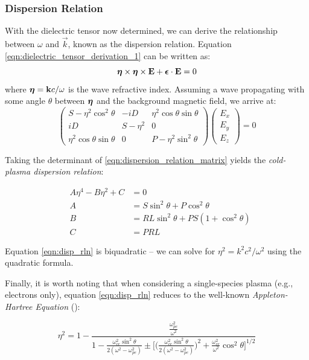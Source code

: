 \subsubsection{Dispersion Relation}
With the dielectric tensor now determined, we can derive the relationship between $\omega$ and $\vec{k}$, known as the dispersion relation. Equation \ref{eqn:dielectric_tensor_derivation_1} can be written as:
\begin{equation}
\boldsymbol{\eta}\times \boldsymbol{\eta} \times \mathbf{E} +  \boldsymbol{\epsilon}\cdot\mathbf{E} = 0
\end{equation}
where $\boldsymbol{\eta} = \mathbf{k}c/\omega$ is the wave refractive index. Assuming a wave propagating with some angle $\theta$ between $\boldsymbol{\eta}$ and the background magnetic field, we arrive at:
\begin{equation}
\begin{pmatrix}
S - \eta^2\cos^2\theta & -iD & \eta^2\cos{\theta}\sin{\theta} \\
iD & S - \eta^2 & 0 \\
\eta^2\cos{\theta}\sin{\theta} & 0 & P - \eta^2\sin^2{\theta} \end{pmatrix}\begin{pmatrix}E_x \\ E_y \\ E_z\end{pmatrix} = 0
\label{eqn:dispersion_relation_matrix}
\end{equation}

Taking the determinant of \ref{eqn:dispersion_relation_matrix} yields the \emph{cold-plasma dispersion relation}:

\begin{eqnarray}
&A\eta^4 - B\eta^2 + C &= 0 \label{eqn:disp_rln}  \\
&A& = S \sin^2\theta + P\cos^2\theta \\
&B& = RL\sin^2\theta + PS(1 + \cos^2\theta) \\
&C& = PRL
\end{eqnarray}

Equation \ref{eqn:disp_rln} is biquadratic -- we can solve for $\eta^2 = k^2c^2/\omega^2$ using the quadratic formula.

Finally, it is worth noting that when considering a single-species plasma (e.g., electrons only), equation \ref{eqn:disp_rln} reduces to the well-known \emph{Appleton-Hartree Equation} (\cite{Appleton1932}):


\begin{equation}
\eta^2 = 1 - \frac{\frac{\omega_{pe}^2}{\omega^2}}{1 - \frac{\omega_{ce}^2\sin^2\theta}{2(\omega^2 - \omega_{pe}^2)} \pm\big[\big(\frac{\omega_{ce}^2\sin^2\theta}{2(\omega^2 - \omega_{pe}^2)}\big)^2 + \frac{\omega_{ce}^2}{\omega^2}\cos^2\theta\big]^{1/2}}
\end{equation}

